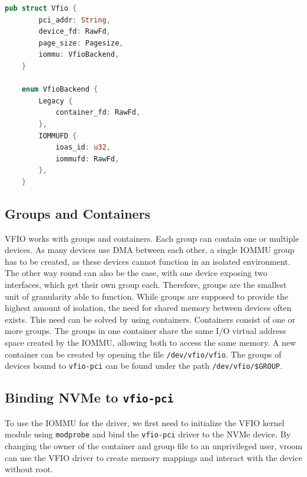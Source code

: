 \begin{lstlisting}[language=Rust,caption={Structs used to model VFIO}, label=lst:vfiostructs]
    pub struct Vfio {
        pci_addr: String,
        device_fd: RawFd,
        page_size: Pagesize,
        iommu: VfioBackend,
    } 

    enum VfioBackend {
        Legacy {
            container_fd: RawFd,
        },
        IOMMUFD {
            ioas_id: u32,
            iommufd: RawFd,
        },
    }
\end{lstlisting}





\subsection{Groups and Containers}
VFIO works with groups and containers. Each group can contain one or multiple devices. As many devices use DMA between each other, a single IOMMU group has to be created, as these devices cannot function in an isolated environment. The other way round can also be the case, with one device exposing two interfaces, which get their own group each. Therefore, groups are the smallest unit of granularity able to function. While groups are supposed to provide the highest amount of isolation, the need for shared memory between devices often exists. This need can be solved by using containers. Containers consist of one or more groups. The groups in one container share the same I/O virtual address space created by the IOMMU, allowing both to access the same memory.
A new container can be created by opening the file \texttt{/dev/vfio/vfio}. The groups of devices bound to \texttt{vfio-pci} can be found under the path \texttt{/dev/vfio/\$GROUP}.

\subsection{Binding NVMe to \texttt{vfio-pci}}\label{sec:bindvfiopci}
To use the IOMMU for the driver, we first need to initialize the VFIO kernel module using \texttt{modprobe} and bind the \texttt{vfio-pci} driver to the NVMe device. By changing the owner of the container and group file to an unprivileged user, vroom can use the VFIO driver to create memory mappings and interact with the device without root.

